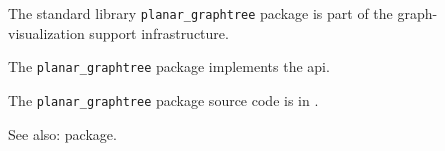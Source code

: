 
The standard library {\tt planar\_graphtree} package is part of the graph-visualization support infrastructure.

The {\tt planar\_graphtree} package implements the  api.

The {\tt planar\_graphtree} package source code is in .

See also:  package.




